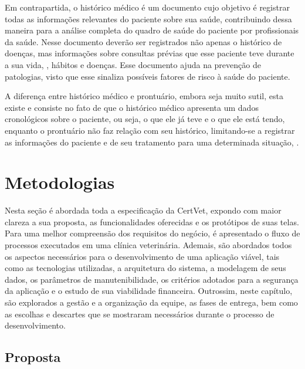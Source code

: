 \documentclass[
    12pt,               %
    openright,          %
    oneside,
    a4paper,            %
    BIBLATEX,           %
    TODO,               %
    english,            %
    brazil              %
    ]{ifsp-spo-inf-ctds}
\begin{document}
    Em contrapartida, o histórico médico é um documento cujo objetivo é registrar todas as informações relevantes do paciente sobre sua saúde, contribuindo dessa maneira para a análise completa do quadro de saúde do paciente por profissionais da saúde. Nesse documento deverão ser registrados não apenas o histórico de doenças, mas informações sobre consultas prévias que esse paciente teve durante a sua vida, , hábitos e doenças. Esse documento ajuda na prevenção de patologias, visto que esse sinaliza possíveis fatores de risco à saúde do paciente. %

    A diferença entre histórico médico e prontuário, embora seja muito sutil, esta existe e consiste no fato de que o histórico médico apresenta um dados cronológicos sobre o paciente, ou seja, o que ele já teve e o que ele está tendo, enquanto o prontuário não faz relação com seu histórico, limitando-se a registrar as informações do paciente e de seu tratamento para uma determinada situação, . 

\chapter[Metodologias]{Metodologias}

    Nesta seção é abordada toda a especificação da CertVet, expondo com maior clareza a sua proposta, as funcionalidades oferecidas e os protótipos de suas telas. Para uma melhor compreensão dos requisitos do negócio, é apresentado o fluxo de processos executados em uma clínica veterinária. Ademais, são abordados todos os aspectos necessários para o desenvolvimento de uma aplicação viável, tais como as tecnologias utilizadas, a arquitetura do sistema, a modelagem de seus dados, os parâmetros de manutenibilidade, os critérios adotados para a segurança da aplicação e o estudo de sua viabilidade financeira. Outrossim, neste capítulo, são explorados a gestão e a organização da equipe, as fases de entrega, bem como as escolhas e descartes que se mostraram necessários durante o processo de desenvolvimento.

    \section{Proposta}
\end{document}
